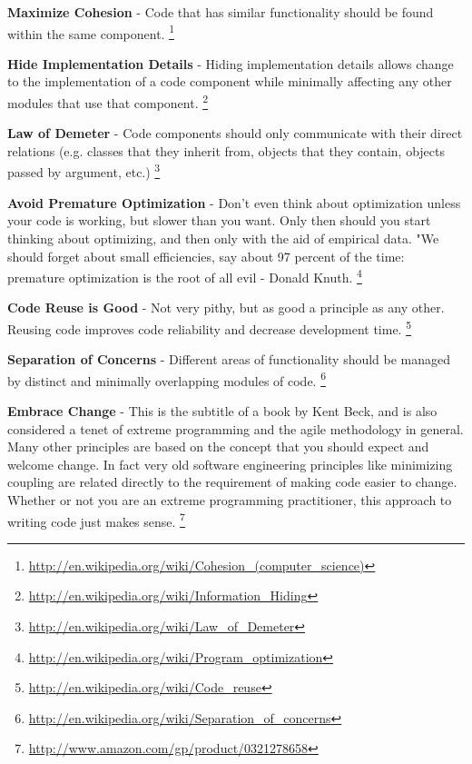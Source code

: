 \textbf{Maximize Cohesion} - Code that has similar functionality should be found within
the same component.
\footnote{\url{http://en.wikipedia.org/wiki/Cohesion_(computer_science)}}

\textbf{Hide Implementation Details} - Hiding implementation details allows change to
the implementation of a code component while minimally affecting any other
modules that use that component.
\footnote{\url{http://en.wikipedia.org/wiki/Information_Hiding}}

\textbf{Law of Demeter} - Code components should only communicate with their direct
relations (e.g. classes that they inherit from, objects that they contain,
objects passed by argument, etc.)
\footnote{\url{http://en.wikipedia.org/wiki/Law_of_Demeter}}

\textbf{Avoid Premature Optimization} - Don't even think about optimization unless your
code is working, but slower than you want. Only then should you start thinking
about optimizing, and then only with the aid of empirical data. "We should
forget about small efficiencies, say about 97 percent of the time: premature
optimization is the root of all evil - Donald Knuth.
\footnote{\url{http://en.wikipedia.org/wiki/Program_optimization}}

\textbf{Code Reuse is Good} - Not very pithy, but as good a principle as any other.
Reusing code improves code reliability and decrease development time.
\footnote{\url{http://en.wikipedia.org/wiki/Code_reuse}}

\textbf{Separation of Concerns} - Different areas of functionality should be managed by
distinct and minimally overlapping modules of code.
\footnote{\url{http://en.wikipedia.org/wiki/Separation_of_concerns}}

\textbf{Embrace Change} - This is the subtitle of a book by Kent Beck, and is also
considered a tenet of extreme programming and the agile methodology in general.
Many other principles are based on the concept that you should expect and
welcome change. In fact very old software engineering principles like
minimizing coupling are related directly to the requirement of making code
easier to change. Whether or not you are an extreme programming practitioner,
this approach to writing code just makes sense.
\footnote{\url{http://www.amazon.com/gp/product/0321278658}}

